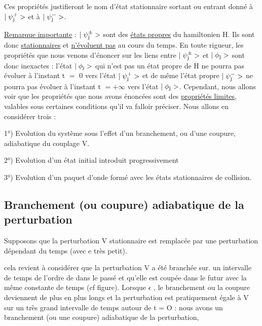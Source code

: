 Ces propriétés justifieront le nom d'état stationnaire
sortant ou entrant donné à $|\;\psi_{\text{j}}^+>$ et à $|\;\psi_{\text{j}}^->$.

\ul{Remarque importante} :
$|\;\psi_{\text{j}}^\pm>$ sont des \ul{états propres} du hamiltonien H. Ils sont donc \ul{stationnaires} et
\ul{n'évoluent pas} au cours du temps. En toute rigueur, les propriétés
que nous venons d'énoncer sur les liens entre $|\;\psi_{\text{j}}^\pm>$ et $|\;\phi_{\text{j}}>$ sont donc
inexactes : l'état $|\;\phi_{\text{j}}>$ qui n'est pas un état propre de H ne pourra pas
évoluer à l'instant t $=$ 0 vers l'état $|\;\psi_{\text{j}}^+>$ et de même l'état propre
$|\;\psi_{\text{j}}^->$ ne pourra pas évoluer à l'instant t $= +\infty$ vers l'état $|\;\phi_{\text{j}}>$.
Cependant, nous allons voir que les propriétés que nous avons énoncées
sont des \ul{propriétés limites}, valables sous certaines conditions qu'il va
falloir préciser. Nous allons en considérer trois :

1°) Evolution du système sous l'effet d'un branchement, ou
d'une coupure, adiabatique du couplage V.

2°) Evolution d'un état initial introduit progressivement
 
3°) Evolution d'un paquet d'onde formé avec les états stationnaires de collision.

\subsection{Branchement (ou coupure) adiabatique de la perturbation}%

\begin{center}  \end{center}

Supposons que la perturbation V stationnaire est remplacée
par une perturbation dépendant du temps
(avec e très petit).

cela revient à considérer que la perturbation V a été branchée sur. un intervalle
de temps de l'ordre de  dans le passé et qu'elle est coupée
dans le futur avec la même constante de temps (cf figure). Lorsque $\epsilon$ ,
le branchement ou la coupure deviennent de plus en plus longs et la perturbation
est pratiquement égale à V sur un très grand intervalle de temps autour de t = O :
nous avons un branchement (ou une coupure) adiabatique de
la perturbation,

